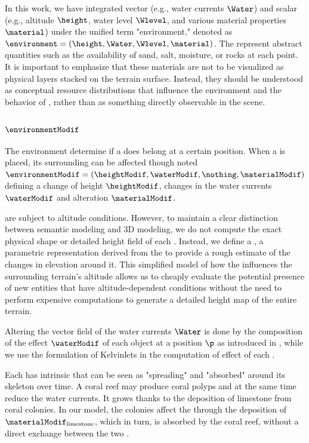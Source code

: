 In this work, we have integrated vector  (e.g., water currents $\Water$) and scalar  (e.g., altitude $\height$, water level $\Wlevel$, and various material properties $\material$) under the unified term "environment," denoted as $\environment = \left( \height, \Water, \Wlevel, \material \right)$. The  represent abstract quantities such as the availability of sand, salt, moisture, or rocks at each point. It is important to emphasize that these materials are not to be visualized as physical layers stacked on the terrain surface. Instead, they should be understood as conceptual resource distributions that influence the environment and the behavior of , rather than as something directly observable in the scene.

\subsubsection{ $\environmentModif$}
The environment determine if a  does belong at a certain position. When a  is placed, its surrounding  can be affected though  noted $\environmentModif = (\heightModif, \waterModif, \nothing, \materialModif)$ defining a change of height $\heightModif$, changes in the water currents $\waterModif$ and  alteration $\materialModif$. 

 are subject to altitude conditions. However, to maintain a clear distinction between semantic modeling and 3D modeling, we do not compute the exact physical shape or detailed height field of each . Instead, we define a , a parametric representation derived from the  to provide a rough estimate of the changes in elevation around it. This simplified model of how the  influences the surrounding terrain's altitude allows us to cheaply evaluate the potential presence of new entities that have altitude-dependent conditions without the need to perform expensive computations to generate a detailed height map of the entire terrain. 

Altering the vector field of the water currents $\Water$ is done by the composition of the effect $\waterModif$ of each object at a position $\p$ as introduced in \citep{Wejchert1991}, while we use the formulation of Kelvinlets \cite{DeGoes2017} in the computation of effect of each .

Each  has intrinsic  that can be seen as "spreading" and "absorbed" around its skeleton over time. A coral reef may produce coral polyps and at the same time reduce the water currents. It grows thanks to the deposition of limestone from coral colonies. In our model, the colonies affect the  through the deposition of  $\materialModif_\text{limestone}$, which in turn, is absorbed by the coral reef, without a direct exchange between the two .

